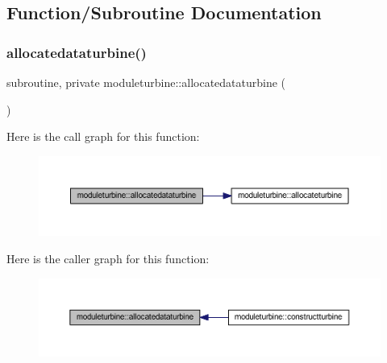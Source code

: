 \subsection{Function/\+Subroutine Documentation}
\mbox{\label{namespacemoduleturbine_a7059f998720fdb2216b49dcc732d5d14}} 
\subsubsection{\texorpdfstring{allocatedataturbine()}{allocatedataturbine()}}
{\footnotesize\ttfamily subroutine, private moduleturbine\+::allocatedataturbine (\begin{DoxyParamCaption}{ }\end{DoxyParamCaption})\hspace{0.3cm}{\ttfamily [private]}}

Here is the call graph for this function\+:\nopagebreak
\begin{figure}[H]
\begin{center}
\leavevmode
\includegraphics[width=350pt]{namespacemoduleturbine_a7059f998720fdb2216b49dcc732d5d14_cgraph}
\end{center}
\end{figure}
Here is the caller graph for this function\+:\nopagebreak
\begin{figure}[H]
\begin{center}
\leavevmode
\includegraphics[width=350pt]{namespacemoduleturbine_a7059f998720fdb2216b49dcc732d5d14_icgraph}
\end{center}
\end{figure}
\mbox{\label{namespacemoduleturbine_ae9c4617b28df25e1f4b06eb1ae1051e4}} 
